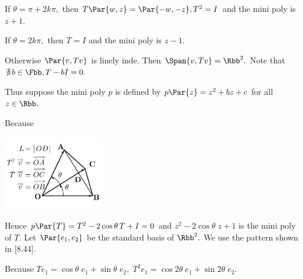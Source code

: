 \par\quad
If $\theta=\pi+2k\pi,$ then $T\Par{w,z}=\Par{-w,-z},T^2=I$ and the mini poly is $z+1.$\par\quad
If $\theta=2k\pi,$ then $T=I$ and the mini poly is $z-1.$\par\quad
Otherwise $\Par{v,Tv}$ is linely inde. Then $\Span{v,Tv}=\Rbb^2.$ Note that $\nexists\,b\in\Fbb,T-bI=0.$\par\quad
\par\vspace{-16pt}\quad
Thus suppose the mini poly $p$ is defined by $p\Par{z}=z^2+bz+c$ for all $z\in\Rbb.$\par\vspace{20pt}\quad
Because\vspace{-35pt}\par\quad
\hspace{50pt}\includegraphics[width=4.4cm,height=3.2cm,scale=0.22]{./diagram2.png}\par\vspace{-70pt}\quad
{}\par\quad
Hence $p\Par{T}=T^2-2\cos\theta\, T+I=0$ and $z^2-2\cos\theta\;z+1$ is the mini poly of $T.$\PfEnd\vspace{6pt}\quad
\Or Let $\Par{e_1,e_2}$ be the standard basis of $\Rbb^2.$ We use the pattern shown in [8.44].\par\quad
Because $Te_1=\cos\theta\;e_1+\sin\theta\;e_2,\;T^2e_1=\cos2\theta\;e_1+\sin2\theta\;e_2.$\par\vspace{2pt}\quad
